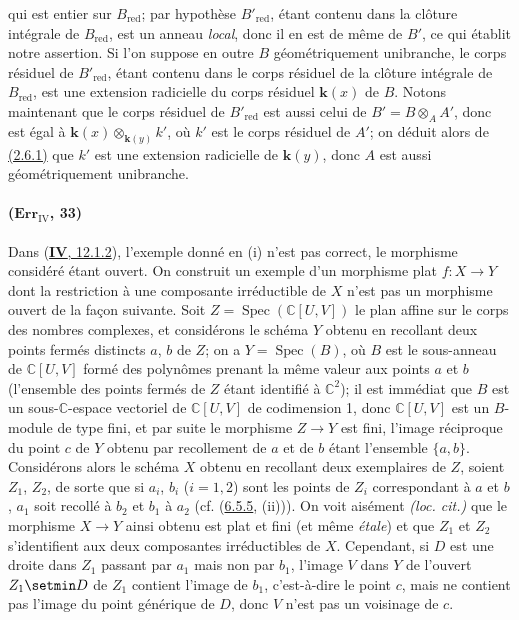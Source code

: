 qui est entier sur $B_{\mathrm{red}}$; par hypothèse
$B'_{\mathrm{red}}$, étant contenu dans la clôture intégrale de
$B_{\mathrm{red}}$, est un anneau \emph{local}, donc il en est de même de
$B'$, ce qui établit notre assertion.
Si l'on suppose en outre $B$ géométriquement unibranche, le corps
résiduel de $B'_{\mathrm{red}}$, étant contenu dans le corps résiduel de
la clôture intégrale de $B_{\mathrm{red}}$, est une extension radicielle
du corps résiduel $\boldsymbol{k}(x)$ de $B$. Notons maintenant que le corps résiduel
de $B'_{\mathrm{red}}$ est aussi celui de $B'=B\otimes_AA'$, donc est
égal à $\boldsymbol{k}(x)\otimes_{\mathbf{k}(y)}k'$, où $k'$ est le corps résiduel de $A'$;
on déduit alors de {\hyperref[canon-index.ega4.c04.prop.2-6-1]{(2.6.1)}} que $k'$
est une extension radicielle de $\boldsymbol{k}(y)$, donc $A$ est aussi
géométriquement unibranche.

\paragraph{($\mathbf{Err}_{\mathrm{IV}}$, 33)}
Dans ({\hyperref[canon-index.ega4.c04.item.12-1-2]{\textbf{IV}, 12.1.2}}), l'exemple donné
en (i) n'est pas correct, le morphisme considéré étant ouvert. On
construit un exemple d'un morphisme plat $f:X\to Y$ dont la restriction
à une composante irréductible de $X$ n'est pas un morphisme ouvert de
la façon suivante. Soit $Z=\operatorname{Spec}(\mathbb C[U,V])$ le
plan affine sur le corps des nombres complexes, et considérons le
schéma $Y$ obtenu en recollant deux points fermés distincts $a$, $b$ de
$Z$; on a $Y=\operatorname{Spec}(B)$, où $B$ est le sous-anneau de
$\mathbb C[U,V]$ formé des polynômes prenant la même valeur aux points
$a$ et $b$ (l'ensemble des points fermés de $Z$ étant identifié à
$\mathbb C^2$); il est immédiat que $B$ est un sous-$\mathbb C$-espace
vectoriel de $\mathbb C[U,V]$ de codimension 1, donc $\mathbb C[U,V]$
est un $B$-module de type fini, et par suite le morphisme $Z\to Y$ est
fini, l'image réciproque du point $c$ de $Y$ obtenu par recollement de
$a$ et de $b$ étant l'ensemble $\{a,b\}$.
Considérons alors le schéma $X$ obtenu en recollant deux exemplaires de
$Z$, soient $Z_1$, $Z_2$, de sorte que si $a_i$, $b_i$ ($i=1,2$) sont
les points de $Z_i$ correspondant à $a$ et $b$, $a_1$ soit recollé à
$b_2$ et $b_1$ à $a_2$ (cf. ({\hyperref[canon-index.ega4.c04.item.6-5-5]{6.5.5}},
(ii))). On voit aisément \emph{(loc. cit.)} que le morphisme $X\to Y$
ainsi obtenu est plat et fini (et même \emph{étale}) et que $Z_1$ et $Z_2$
s'identifient aux deux composantes irréductibles de $X$. Cependant, si
$D$ est une droite dans $Z_1$ passant par $a_1$ mais non par $b_1$,
l'image $V$ dans $Y$ de l'ouvert $Z_1\setmin D$ de $Z_1$ contient l'image de
$b_1$, c'est-à-dire le point $c$, mais ne contient pas l'image du point
générique de $D$, donc $V$ n'est pas un voisinage de $c$.


